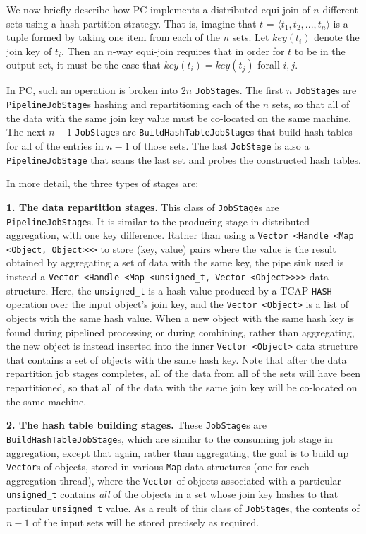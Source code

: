 We now briefly describe how PC implements a distributed equi-join of $n$ different sets using a hash-partition strategy.  
That is, imagine that $t$ = $\langle t_1, t_2, ..., t_n \rangle$ is a
tuple formed by taking one item from each of the $n$ sets.  Let $key(t_i)$ denote the join key of $t_i$.  Then an $n$-way equi-join requires that
in order for $t$ to be in the output set, it must be the case that
$key(t_i) = key(t_j)$ forall $i, j$. 

In PC, such an operation is broken into $2n$ \texttt{JobStage}s. The first $n$
\texttt{JobStage}s are \texttt{PipelineJobStage}s hashing and repartitioning each of the $n$ sets, so that all of the data with the same join key value
must be co-located on the same machine.  The next $n - 1$ \texttt{JobStage}s
are \texttt{BuildHashTableJobStage}s that build hash tables for all of the
entries in $n - 1$ of those sets.  The last \texttt{JobStage} is also a 
\texttt{PipelineJobStage} that scans the last set and
probes the constructed hash tables.  

In more detail, the three types of stages are:

\vspace{5pt}
{\bf 1. The data repartition stages.} This class of \texttt{JobStage}s are
\texttt{PipelineJobStage}s. It is similar to the producing stage in distributed
aggregation, with one key difference.
Rather than using a \texttt{Vector <Handle <Map <Object, Object>>>} to store (key, value) pairs where the value is the result obtained by aggregating a set of
data with the same key, the pipe sink used is instead a \texttt{Vector <Handle <Map <unsigned\_t, Vector <Object>>>>} data structure.  Here, the
\texttt{unsigned\_t} is a hash value produced by a TCAP \texttt{HASH} operation over the input object's join key, and the \texttt{Vector <Object>} is a list of objects
with the same hash value.  
When a new object with the same hash key is found during pipelined processing or during combining, rather than aggregating, the new object is instead inserted
into the inner \texttt{Vector <Object>} data structure that contains a set of objects with the same hash key.
Note that after the data repartition job stages completes, all of the data from all of the sets will have been repartitioned, so that all of the data with the same join
key will be co-located on the same machine.

\vspace{5pt}
{\bf 2. The hash table building stages.} These \texttt{JobStage}s are
\texttt{BuildHashTableJobStage}s, which are similar to the consuming job stage in aggregation, 
except that again, rather than aggregating, the goal is to build up \texttt{Vector}s of objects, stored in various \texttt{Map} data structures (one for each
aggregation thread), where the \texttt{Vector} of objects associated with a particular 
\texttt{unsigned\_t} contains \emph{all} of the objects in a set whose join key hashes to that particular \texttt{unsigned\_t} value.
As a reult of this class of \texttt{JobStage}s, the contents of $n - 1$ of the input sets will be stored precisely as required.

